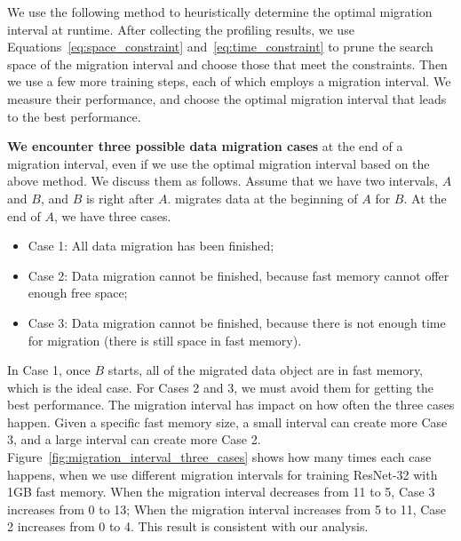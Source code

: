We use the following method to \textcolor{dong2}{heuristically }determine the optimal migration interval at runtime. After collecting the profiling results, we use Equations~\ref{eq:space_constraint} and~\ref{eq:time_constraint} to prune the search space of the migration interval and choose those that meet the constraints. Then we use a few more training steps, each of which employs a migration interval. We measure their performance, and choose the optimal migration interval that leads to the best performance. %


\textbf{We encounter three possible data migration cases} at the end of a migration interval,  \textcolor{check}{even if we use the optimal migration interval based on the above method}. We discuss them as follows. Assume that we have two intervals, $A$ and $B$, and $B$ is right after $A$. \name migrates data at the beginning of $A$ for $B$. At the end of $A$, we have three cases. %
\begin{itemize}[leftmargin=*]
    \item Case 1: All data migration has been finished;
    \item Case 2: Data migration cannot be finished, because fast memory cannot offer enough free space;
    \item Case 3: Data migration cannot be finished, because there is not 
    enough time for migration (there is still space in fast memory).
\end{itemize}

In Case 1, once $B$ starts, all of the migrated data object are in fast memory, which is the ideal case. For Cases 2 and 3, we must avoid them for getting the best performance. %
The migration interval has impact on how often the three cases happen. Given a specific fast memory size, a small interval can create more Case 3, and a large interval can create more Case 2. Figure~\ref{fig:migration_interval_three_cases} shows how many times each case happens, when we use different migration intervals for training ResNet-32 with 1GB fast memory. When the migration interval decreases from 11 to 5, Case 3 increases from 0 to 13; When the migration interval increases from 5 to 11, Case 2 increases from 0 to 4. This result is consistent with our analysis.

